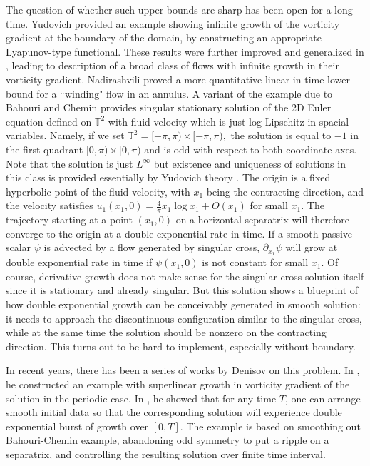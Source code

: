 \documentclass[reqno,centertags, 11pt]{amsart}
\def \Tm {\mathbb T}
\begin{document}
The question of whether such upper bounds are sharp has been open for a long time. Yudovich \cite{Jud1,Yud2} provided an example showing
 infinite
growth of the vorticity gradient at the boundary of the domain, by constructing an appropriate Lyapunov-type functional. These results were
 further
improved and generalized in \cite{MSY}, leading to description of a broad class of flows with infinite growth in their vorticity gradient.
Nadirashvili \cite{Nad1} proved a more quantitative linear in time lower bound for a ``winding" flow in an annulus.
A variant of the example due to Bahouri and Chemin
\cite{BC} provides singular stationary solution of the 2D Euler equation defined on $\Tm^2$ with fluid velocity which is
just log-Lipschitz in spacial
variables. Namely, if we set $\Tm^2 = [-\pi,\pi) \times [-\pi,\pi),$ the solution is equal to $-1$ in the first quadrant
$[0,\pi) \times [0,\pi)$
and is odd with respect to both coordinate axes. Note that the solution is just $L^\infty$ but existence and uniqueness of solutions in
this class
is provided essentially by Yudovich theory \cite{Yudth}. The origin is a fixed hyperbolic point of the fluid velocity, with $x_1$ being the contracting direction, and
the velocity satisfies $u_1(x_1,0) = \frac{4}{\pi} x_1 \log x_1 +O(x_1)$ for small $x_1.$
The trajectory starting at a point $(x_1,0)$ on a horizontal separatrix will therefore converge to the origin at a double exponential rate
in time. If a smooth passive scalar $\psi$ is advected by a flow generated by singular cross, $\partial_{x_1}\psi$ will grow at double
exponential
rate in time if $\psi(x_1,0)$ is not constant for small $x_1.$ Of course, derivative growth does not make sense for  the singular cross
solution
itself since it is stationary and already singular. But this solution shows a blueprint of how double exponential growth can be conceivably
generated in smooth solution: it needs to approach the discontinuous configuration similar to the singular cross, while at the
same time the solution should be nonzero on the contracting direction. This turns out to be hard to implement, especially without boundary.

In recent years, there has been a series of works by Denisov on this problem. In \cite{Den1}, he constructed an example with superlinear
growth in vorticity gradient of the solution in the periodic case. In \cite{Den2}, he showed that for any time $T$, one can arrange smooth initial
data so that the corresponding
solution will experience double exponential burst of growth over $[0,T].$ The example is based on smoothing out Bahouri-Chemin example,
abandoning odd symmetry to put a ripple on a separatrix, and controlling the resulting solution over finite time interval.
\end{document}
